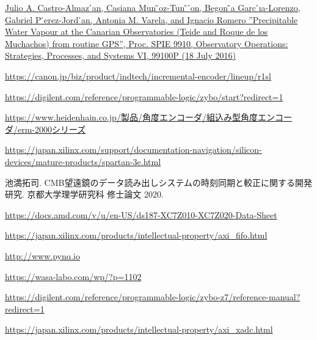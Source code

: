\begin{thebibliography}{99}


\href{http://dx.doi.org/https://doi.org/10.1117/12.2232646}{Julio A. Castro-Almaz ́an, Casiana Mun ̃oz-Tun ̃ ́on, Begon ̃a Garc ́ıa-Lorenzo, Gabriel P ́erez-Jord ́an, Antonia M. Varela, and Ignacio Romero ”Precipitable Water Vapour at the Canarian Observatories (Teide and Roque de los Muchachos) from routine GPS”, Proc. SPIE 9910, Observatory Operations: Strategies, Processes, and Systems VI, 99100P (18 July 2016)}

\href{https://canon.jp/biz/product/indtech/incremental-encoder/lineup/r1sl}{https://canon.jp/biz/product/indtech/incremental-encoder/lineup/r1sl}

\href{https://digilent.com/reference/programmable-logic/zybo/start?redirect=1}{https://digilent.com/reference/programmable-logic/zybo/start?redirect=1}

\href{https://www.heidenhain.co.jp/製品/角度エンコーダ/組込み型角度エンコーダ/erm-2000シリーズ}{https://www.heidenhain.co.jp/製品/角度エンコーダ/組込み型角度エンコーダ/erm-2000シリーズ}

\href{https://japan.xilinx.com/support/documentation-navigation/silicon-devices/mature-products/spartan-3e.html}{
https://japan.xilinx.com/support/documentation-navigation/silicon-devices/mature-products/spartan-3e.html}

池満拓司. CMB望遠鏡のデータ読み出しシステムの時刻同期と較正に関する開発研究. 京都大学理学研究科 修士論文 2020.

\href{https://docs.amd.com/v/u/en-US/ds187-XC7Z010-XC7Z020-Data-Sheet}{https://docs.amd.com/v/u/en-US/ds187-XC7Z010-XC7Z020-Data-Sheet}

\href{https://japan.xilinx.com/products/intellectual-property/axi\_fifo.html}{https://japan.xilinx.com/products/intellectual-property/axi\_fifo.html}

\href{http://www.pynq.io}{http://www.pynq.io}

\href{https://wasa-labo.com/wp/?p=1102}{https://wasa-labo.com/wp/?p=1102}

\href{https://digilent.com/reference/programmable-logic/zybo-z7/reference-manual?redirect=1}{https://digilent.com/reference/programmable-logic/zybo-z7/reference-manual?redirect=1}

\href{https://japan.xilinx.com/products/intellectual-property/axi\_xadc.html}{https://japan.xilinx.com/products/intellectual-property/axi\_xadc.html}



\end{thebibliography}
